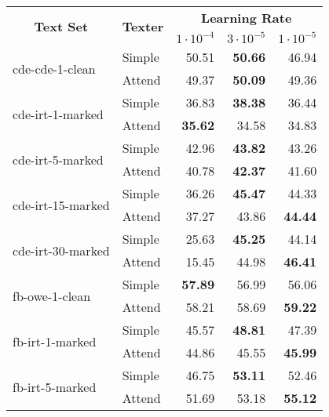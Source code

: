 \begin{tabular}{| l | l | r | r | r |}
    \hline

    \multicolumn{1}{|c|}{\multirow{2}{*}{\textbf{Text Set}}} &
    \multicolumn{1}{|c|}{\multirow{2}{*}{\textbf{Texter}}} &
    \multicolumn{3}{|c|}{\textbf{Learning Rate}} \\

    &
    &
    \multicolumn{1}{|c|}{\textbf{$1 \cdot 10^{-4}$}} &
    \multicolumn{1}{|c|}{\textbf{$3 \cdot 10^{-5}$}} &
    \multicolumn{1}{|c|}{\textbf{$1 \cdot 10^{-5}$}} \\

    \hline \hline

    \multirow{2}{*}{cde-cde-1-clean}
    & Simple & 50.51 & \textbf{50.66} & 46.94 \\
    & Attend & 49.37 & \textbf{50.09} & 49.36 \\ \hline

    \multirow{2}{*}{cde-irt-1-marked}
    & Simple & 36.83 & \textbf{38.38} & 36.44 \\
    & Attend & \textbf{35.62} & 34.58 & 34.83 \\ \hline

    \multirow{2}{*}{cde-irt-5-marked}
    & Simple & 42.96 & \textbf{43.82} & 43.26 \\
    & Attend & 40.78 & \textbf{42.37} & 41.60 \\ \hline

    \multirow{2}{*}{cde-irt-15-marked}
    & Simple & 36.26 & \textbf{45.47} & 44.33 \\
    & Attend & 37.27 & 43.86 & \textbf{44.44} \\ \hline

    \multirow{2}{*}{cde-irt-30-marked}
    & Simple & 25.63 & \textbf{45.25} & 44.14 \\
    & Attend & 15.45 & 44.98 & \textbf{46.41} \\ \hline \hline

    \multirow{2}{*}{fb-owe-1-clean}
    & Simple & \textbf{57.89} & 56.99 & 56.06 \\
    & Attend & 58.21 & 58.69 & \textbf{59.22} \\ \hline

    \multirow{2}{*}{fb-irt-1-marked}
    & Simple & 45.57 & \textbf{48.81} & 47.39 \\
    & Attend & 44.86 & 45.55 & \textbf{45.99} \\ \hline

    \multirow{2}{*}{fb-irt-5-marked}
    & Simple & 46.75 & \textbf{53.11} & 52.46 \\
    & Attend & 51.69 & 53.18 & \textbf{55.12} \\ \hline


\end{tabular}

